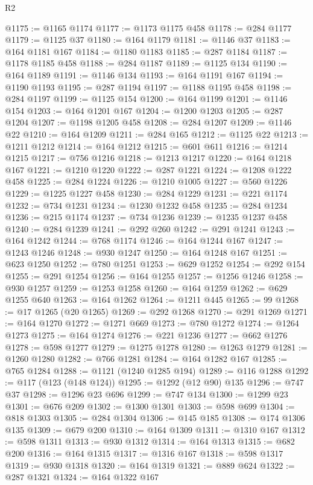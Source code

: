 \begin{lexlean}{R2}
\begin{coremodule}
@1175 := @1165 @1174
@1177 := @1173 @1175 @458
@1178 := @284 @1177
@1179 := @1125 @37
@1180 := @164 @1179
@1181 := @1146 @37
@1183 := @164 @1181 @167
@1184 := @1180 @1183
@1185 := @287 @1184
@1187 := @1178 @1185 @458
@1188 := @284 @1187
@1189 := @1125 @134
@1190 := @164 @1189
@1191 := @1146 @134
@1193 := @164 @1191 @167
@1194 := @1190 @1193
@1195 := @287 @1194
@1197 := @1188 @1195 @458
@1198 := @284 @1197
@1199 := @1125 @154
@1200 := @164 @1199
@1201 := @1146 @154
@1203 := @164 @1201 @167
@1204 := @1200 @1203
@1205 := @287 @1204
@1207 := @1198 @1205 @458
@1208 := @284 @1207
@1209 := @1146 @22
@1210 := @164 @1209
@1211 := @284 @165
@1212 := @1125 @22
@1213 := @1211 @1212
@1214 := @164 @1212
@1215 := @601 @611
@1216 := @1214 @1215
@1217 := @756 @1216
@1218 := @1213 @1217
@1220 := @164 @1218 @167
@1221 := @1210 @1220
@1222 := @287 @1221
@1224 := @1208 @1222 @458
@1225 := @284 @1224
@1226 := @1210 @1005
@1227 := @560 @1226
@1229 := @1225 @1227 @458
@1230 := @284 @1229
@1231 := @221 @1174
@1232 := @734 @1231
@1234 := @1230 @1232 @458
@1235 := @284 @1234
@1236 := @215 @1174
@1237 := @734 @1236
@1239 := @1235 @1237 @458
@1240 := @284 @1239
@1241 := @292 @260
@1242 := @291 @1241
@1243 := @164 @1242
@1244 := @768 @1174
@1246 := @164 @1244 @167
@1247 := @1243 @1246
@1248 := @930 @1247
@1250 := @164 @1248 @167
@1251 := @623 @1250
@1252 := @780 @1251
@1253 := @629 @1252
@1254 := @292 @154
@1255 := @291 @1254
@1256 := @164 @1255
@1257 := @1256 @1246
@1258 := @930 @1257
@1259 := @1253 @1258
@1260 := @164 @1259
@1262 := @629 @1255 @640
@1263 := @164 @1262
@1264 := @1211 @445
@1265 := 99
@1268 := @17 @1265 (@20 @1265)
@1269 := @292 @1268
@1270 := @291 @1269
@1271 := @164 @1270
@1272 := @1271 @669
@1273 := @780 @1272
@1274 := @1264 @1273
@1275 := @164 @1274
@1276 := @221 @1236
@1277 := @662 @1276
@1278 := @598 @1277
@1279 := @1275 @1278
@1280 := @1263 @1279
@1281 := @1260 @1280
@1282 := @766 @1281
@1284 := @164 @1282 @167
@1285 := @765 @1284
@1288 := @1121 (@1240 @1285 @194)
@1289 := @116 @1288
@1292 := @117 (@123 (@148 @124))
@1295 := @1292 (@12 @90) @135
@1296 := @747 @37
@1298 := @1296 @23 @696
@1299 := @747 @134
@1300 := @1299 @23
@1301 := @676 @209
@1302 := @1300 @1301
@1303 := @598 @699
@1304 := @818 @1303
@1305 := @284 @1304
@1306 := @145 @185
@1308 := @174 @1306 @135
@1309 := @679 @200
@1310 := @164 @1309
@1311 := @1310 @167
@1312 := @598 @1311
@1313 := @930 @1312
@1314 := @164 @1313
@1315 := @682 @200
@1316 := @164 @1315
@1317 := @1316 @167
@1318 := @598 @1317
@1319 := @930 @1318
@1320 := @164 @1319
@1321 := @889 @624
@1322 := @287 @1321
@1324 := @164 @1322 @167

\end{coremodule}
\end{lexlean}
